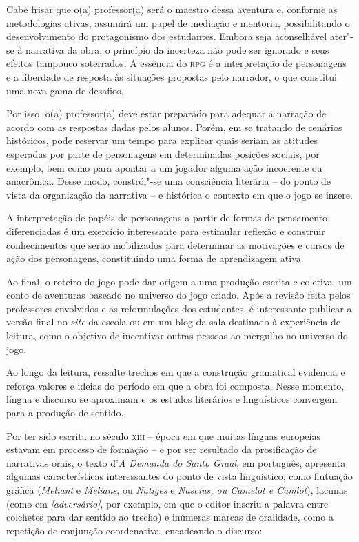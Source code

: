 \documentclass[11pt]{extarticle}
\begin{document}
Cabe frisar que o(a) professor(a) será o maestro dessa aventura e,
conforme as metodologias ativas, assumirá um papel de mediação e
mentoria, possibilitando o desenvolvimento do protagonismo dos
estudantes. Embora seja aconselhável ater"-se à narrativa da obra, o
princípio da incerteza não pode ser ignorado e seus efeitos tampouco
soterrados. A essência do \textsc{rpg} é a interpretação de personagens e a
liberdade de resposta às situações propostas pelo narrador, o que
constitui uma nova gama de desafios.

Por isso, o(a) professor(a) deve estar preparado para adequar a narração
de acordo com as respostas dadas pelos alunos. Porém, em se tratando de
cenários históricos, pode reservar um tempo para explicar quais seriam
as atitudes esperadas por parte de personagens em determinadas posições
sociais, por exemplo, bem como para apontar a um jogador alguma ação
incoerente ou anacrônica. Desse modo, constrói"-se uma consciência
literária -- do ponto de vista da organização da narrativa -- e
histórica o contexto em que o jogo se insere.

A interpretação de papéis de personagens a partir de formas de
pensamento diferenciadas é um exercício interessante para estimular
reflexão e construir conhecimentos que serão mobilizados para determinar
as motivações e cursos de ação dos personagens, constituindo uma forma
de aprendizagem ativa.

Ao final, o roteiro do jogo pode dar origem a uma produção escrita e
coletiva: um conto de aventuras baseado no universo do jogo criado. Após
a revisão feita pelos professores envolvidos e as reformulações dos
estudantes, é interessante publicar a versão final no \emph{site} da
escola ou em um blog da sala destinado à experiência de leitura, como o
objetivo de incentivar outras pessoas ao mergulho no universo do jogo.

Ao longo da leitura, ressalte trechos em que a construção
gramatical evidencia e reforça valores e ideias do período em que a obra
foi composta. Nesse momento, língua e discurso se aproximam e os estudos
literários e linguísticos convergem para a produção de sentido.

Por ter sido escrita no século \textsc{xiii} -- época em
que muitas línguas europeias estavam em processo de formação -- e por
ser resultado da prosificação de narrativas orais, o texto d'\emph{A
Demanda do Santo Graal}, em português, apresenta algumas características
interessantes do ponto de vista linguístico, como flutuação gráfica
(\emph{Meliant} e \emph{Melians}, ou \emph{Natiges} e \emph{Nascius, ou
Camelot e Camlot}), lacunas (como em \emph{{[}adversário{]}}, por
exemplo, em que o editor inseriu a palavra entre colchetes para dar
sentido ao trecho) e inúmeras marcas de oralidade, como a repetição de
conjunção coordenativa, encadeando o
discurso:
\end{document}
